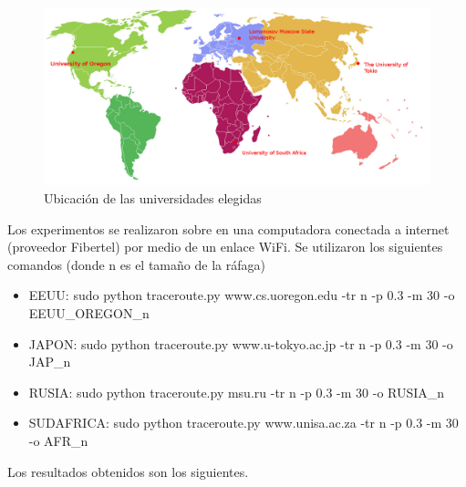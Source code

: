  
\begin{figure}[H]
  \centering
  \includegraphics[scale = 0.3]{imagenes/mapa.png}
  \caption{Ubicación de las universidades elegidas}
  \label{histogramaprobabilidadesModel1}
\end{figure}


Los experimentos se realizaron sobre en una computadora conectada a internet (proveedor Fibertel) por medio de un enlace WiFi. Se utilizaron los siguientes comandos (donde n es el tamaño de la ráfaga) 
\begin{itemize}
  \item EEUU:      sudo python traceroute.py www.cs.uoregon.edu -tr n -p 0.3 -m 30 -o EEUU\_OREGON\_n
  \item JAPON:     sudo python traceroute.py www.u-tokyo.ac.jp  -tr n -p 0.3 -m 30 -o JAP\_n
  \item RUSIA:     sudo python traceroute.py msu.ru             -tr n -p 0.3 -m 30 -o RUSIA\_n
  \item SUDAFRICA: sudo python traceroute.py www.unisa.ac.za    -tr n -p 0.3 -m 30 -o AFR\_n 
\end{itemize}

Los resultados obtenidos son los siguientes.

